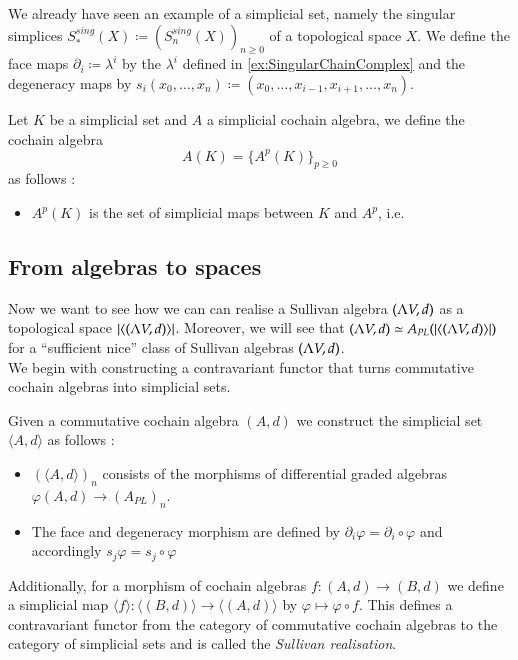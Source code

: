  \begin{Example}
    We already have seen an example of a simplicial set, namely the singular simplices 
    $S^{sing}_*(X) \coloneqq (S_n^{sing}(X))_{n \geq 0}$ of a topological space $X$.
    We define the face maps $\partial_i \coloneqq \lambda^i$ by the $\lambda^i$ defined in \ref{ex:SingularChainComplex} and
    the degeneracy maps by $s_i (x_0, \dotsc, x_n) \coloneqq (x_0, \dotsc, x_{i-1}, x_{i+1}, \dotsc, x_n)$.
 \end{Example}

 \begin{Definition}
  Let $K$ be a simplicial set and $A$ a simplicial cochain algebra, we define the cochain algebra
  $$ A(K) = { \lbrace A^p(K) \rbrace}_{ p \geq 0} $$
  as follows :
  \begin{itemize}
   \item $A^p(K)$ is the set of simplicial maps between $K$ and $A^p$, i.e. 
  \end{itemize}
 \end{Definition}

 \subsection{From algebras to spaces}
 
 Now we want to see how we can can realise a Sullivan algebra $(\Lambda V,d)$ as a topological space 
 $| \langle (\Lambda V,d) \rangle |$. Moreover, we will see that $(\Lambda V,d) \simeq A_{PL}(| \langle (\Lambda V,d) \rangle |)$ for a
 ``sufficient nice'' class of Sullivan algebras $(\Lambda V,d)$. \\
 We begin with constructing a contravariant functor that turns commutative cochain algebras into simplicial sets.
 
 \begin{Definition}
  Given a commutative cochain algebra $(A,d)$ we construct the simplicial set $\langle A , d \rangle$ as follows : \\
  \begin{itemize}
   \item $(\langle A,d \rangle)_n$ consists of the morphisms of differential graded algebras 
   $\varphi (A,d) \to (A_{PL})_n$.
  \item The face and degeneracy morphism are defined by $\partial_i \varphi = \partial_i \circ \varphi$ and
  accordingly ${s_j \varphi = s_j \circ \varphi}$
  \end{itemize}

  Additionally, for a morphism of cochain algebras ${f \colon (A,d) \to (B,d)}$ we define a simplicial map
  ${\langle f \rangle \colon \langle (B,d) \rangle \to \langle (A,d) \rangle}$ by
  ${\varphi \mapsto \varphi \circ f}$. \newline
  This defines a contravariant functor from the category of commutative cochain algebras to the category of simplicial sets
  and is called the \emph{Sullivan realisation}.
 \end{Definition}

